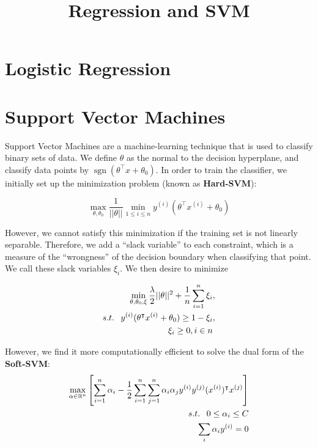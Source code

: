 \documentclass[10pt,letterpaper]{article}
\title{\vspace{-4ex}Regression and SVM\vspace{-3.5ex}}
\DeclareMathOperator{\sign}{sgn}
\begin{document}
\maketitle
\vspace{-0.5em}
\begin{abstract}

\end{abstract}

\section{Logistic Regression}

\section{Support Vector Machines}
Support Vector Machines are a machine-learning technique that is used to classify binary sets of data. We define $\theta$ as the normal to the decision hyperplane, and classify data points by $\sign (\theta^\intercal x + \theta_0)$. In order to train the classifier, we initially set up the minimization problem (known as \textbf{Hard-SVM}):

\begin{equation}
\max_{\theta, \theta_0} \dfrac{1}{||\theta||} \min_{1 \le i \le n} y^{(i)} (\theta^\intercal x^{(i)} + \theta_0)
\end{equation}

However, we cannot satisfy this minimization if the training set is not linearly separable. Therefore, we add a ``slack variable'' to each constraint, which is a measure of the ``wrongness'' of the decision boundary when classifying that point. We call these slack variables $\xi_i$. We then desire to minimize

\begin{align}
\min_{\theta, \theta_0, \xi} \dfrac{\lambda}{2} ||\theta||^2 + \dfrac{1}{n} \sum_{i=1}^{n} \xi_{i} &, \\
s.t. \hspace{.75em} y^{(i)}(\theta^\intercal x^{(i)} + \theta_0) \ge 1 - \xi_i &, \\
\xi_i \ge 0, i \in n &
\end{align}

However, we find it more computationally efficient to solve the dual form of the \textbf{Soft-SVM}:
\begin{align}
\max_{\alpha \in \mathbb{R}^n} \left[ \sum_{i=1}^n \alpha_i - \dfrac{1}{2} \sum_{i=1}^n \sum_{j=1}^n \alpha_i \alpha_j y^{(i)} y^{(j)} (x^{(i)})^\intercal x^{(j)}\right] & \\
s.t. \hspace{.75em} 0 \le \alpha_i \le C & \\
\sum_i \alpha_i y^{(i)} = 0 &
\end{align}
\end{document}
